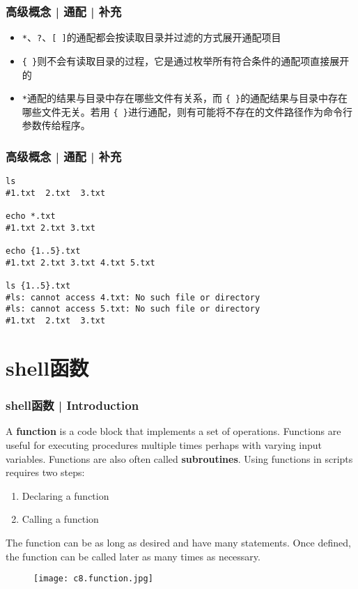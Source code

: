 \begin{frame}[fragile]
  \frametitle{高级概念 | 通配 | 补充}
  \begin{itemize}
    \item \verb|*|、\verb|?|、\verb|[ ]|的通配都会按读取目录并过滤的方式展开通配项目
    \item \verb|{ }|则不会有读取目录的过程，它是通过枚举所有符合条件的通配项直接展开的
    \item \verb|*|通配的结果与目录中存在哪些文件有关系，而 \verb|{ }|的通配结果与目录中存在哪些文件无关。若用 \verb|{ }|进行通配，则有可能将不存在的文件路径作为命令行参数传给程序。
  \end{itemize}
\end{frame}

\begin{frame}[fragile]
  \frametitle{高级概念 | 通配 | 补充}
\begin{lstlisting}
ls
#1.txt  2.txt  3.txt

echo *.txt
#1.txt 2.txt 3.txt

echo {1..5}.txt
#1.txt 2.txt 3.txt 4.txt 5.txt

ls {1..5}.txt
#ls: cannot access 4.txt: No such file or directory
#ls: cannot access 5.txt: No such file or directory
#1.txt  2.txt  3.txt
\end{lstlisting}
\end{frame}

\section{shell函数}
\begin{frame}
  \frametitle{shell函数 | Introduction}
  A \textbf{function} is a code block that implements a set of operations.  Functions are useful for executing procedures multiple times perhaps with varying input variables. Functions are also often called \textbf{subroutines}. Using functions in scripts requires two steps:
  \begin{enumerate}
    \item Declaring a function
    \item Calling a function
  \end{enumerate}
  The function can be as long as desired and have many statements. Once defined, the function can be called later as many times as necessary.
  \begin{figure}
    \centering
    \texttt{[image: c8.function.jpg]}
  \end{figure}
\end{frame}

